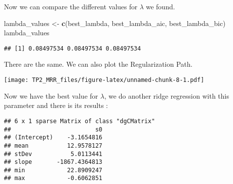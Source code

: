 \documentclass[
]{article}
\newenvironment{Shaded}{\begin{snugshade}}{\end{snugshade}}
\newcommand{\AttributeTok}[1]{\textcolor[rgb]{0.13,0.29,0.53}{#1}}
\newcommand{\DecValTok}[1]{\textcolor[rgb]{0.00,0.00,0.81}{#1}}
\newcommand{\FunctionTok}[1]{\textcolor[rgb]{0.13,0.29,0.53}{\textbf{#1}}}
\newcommand{\NormalTok}[1]{#1}
\newcommand{\OtherTok}[1]{\textcolor[rgb]{0.56,0.35,0.01}{#1}}
\newcommand{\SpecialCharTok}[1]{\textcolor[rgb]{0.81,0.36,0.00}{\textbf{#1}}}
\newcommand{\StringTok}[1]{\textcolor[rgb]{0.31,0.60,0.02}{#1}}
\begin{document}
Now we can compare the different values for \(\lambda\) we found.

\begin{Shaded}
\begin{Highlighting}[]
\NormalTok{lambda\_values }\OtherTok{\textless{}{-}} \FunctionTok{c}\NormalTok{(best\_lambda, best\_lambda\_aic, best\_lambda\_bic)}
\NormalTok{lambda\_values}
\end{Highlighting}
\end{Shaded}

\begin{verbatim}
## [1] 0.08497534 0.08497534 0.08497534
\end{verbatim}

There are the same. We can also plot the Regularization Path.

\begin{Shaded}
\end{Shaded}

\texttt{[image: TP2\_MRR\_files/figure-latex/unnamed-chunk-8-1.pdf]}

Now we have the best value for \(\lambda\), we do another ridge
regression with this parameter and there is its results :

\begin{verbatim}
## 6 x 1 sparse Matrix of class "dgCMatrix"
##                        s0
## (Intercept)    -3.1654816
## mean           12.9578127
## stDev           5.0113441
## slope       -1867.4364813
## min            22.8909247
## max            -0.6062851
\end{verbatim}
\end{document}
